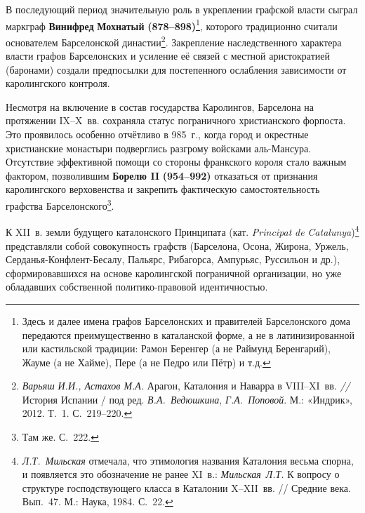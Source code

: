 В последующий период значительную роль в укреплении графской власти сыграл маркграф \textbf{Винифред}\textbf{ Мохнатый} \textbf{(878--898)}\footnote{Здесь и далее имена графов Барселонских и правителей Барселонского дома передаются преимущественно в каталанской форме, а не в латинизированной или кастильской традиции: Рамон Беренгер (а не Раймунд Беренгарий), Жауме (а не Хайме), Пере (а не Педро или Пётр) и т.д.}, которого традиционно считали основателем Барселонской династии\footnote{\emph{Варьяш}\emph{ И.И., Астахов М.А.} Арагон, Каталония и Наварра в VIII--XI~вв. \emph{// }История Испании / под ред. \emph{В.А.~Ведюшкина}, \emph{Г.А.~Поповой}. М.: «Индрик», 2012. Т.~1. С.~219--220.}. Закрепление наследственного характера власти графов Барселонских и усиление её связей с местной аристократией (баронами) создали предпосылки для постепенного ослабления зависимости от каролингского контроля.

Несмотря на включение в состав государства Каролингов, Барселона на протяжении IX--X~вв. сохраняла статус пограничного христианского форпоста. Это проявилось особенно отчётливо в 985~г., когда город и окрестные христианские монастыри подверглись разгрому войсками аль-Мансура. Отсутствие эффективной помощи со стороны франкского короля стало важным фактором, позволившим \textbf{Борелю II}\textbf{ }\textbf{(954--992) }отказаться от признания каролингского верховенства и закрепить фактическую самостоятельность графства Барселонского\footnote{Там же. С.~222.}.

К XII~в. земли будущего каталонского Принципата (кат. \emph{Principat}\emph{ de }\emph{Catalunya})\footnote{\emph{Л.Т.~Мильская} отмечала, что этимология названия Каталония весьма спорна, и появляется это обозначение не ранее XI~в.: \emph{Мильская}\emph{~}\emph{Л.Т.} К вопросу о структуре господствующего класса в Каталонии X--XII~вв. // Средние века. Вып.~47. М.: Наука, 1984. С.~22.} представляли собой совокупность графств (Барселона, Осона, Жирона, Уржель, Серданья-Конфлент-Бесалу, Пальярс, Рибагорса, Ампурьяс, Руссильон и др.), сформировавшихся на основе каролингской пограничной организации, но уже обладавших собственной политико-правовой идентичностью.

